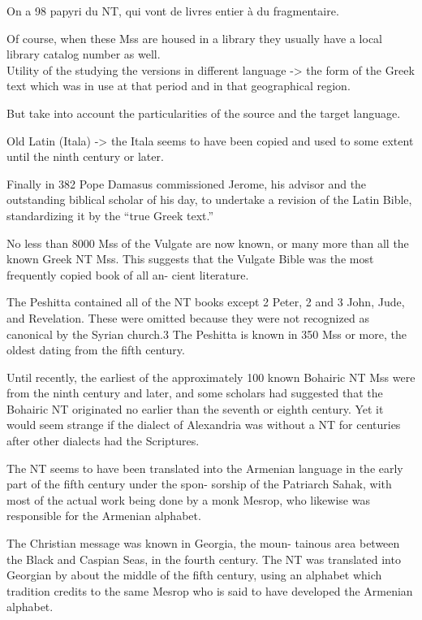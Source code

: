 On a 98 papyri du NT, qui vont de livres entier à du fragmentaire.

Of course, when these Mss are housed in a library
they usually have a local library catalog number as well.\\


Utility of the studying the versions in different language -> the form of the Greek text which was in use at that period and
in that geographical region.

But take into account the particularities of the source and the target language.

Old Latin (Itala)
-> the Itala seems to have
been copied and used to some extent until the ninth century
or later.

Finally in
382 Pope Damasus commissioned Jerome, his advisor and the
outstanding biblical scholar of his day, to undertake a revision
of the Latin Bible, standardizing it by the “true Greek text.” 

No less than 8000 Mss of the Vulgate are now known, or many
more than all the known Greek NT Mss. This suggests that the
Vulgate Bible was the most frequently copied book of all an-
cient literature. 


The Peshitta contained all of the NT books except 2 Peter,
2 and 3 John, Jude, and Revelation. These were omitted because
they were not recognized as canonical by the Syrian church.3
The Peshitta is known in 350 Mss or more, the oldest dating
from the fifth century.


Until recently, the earliest of
the approximately 100 known Bohairic NT Mss were from the
ninth century and later, and some scholars had suggested that
the Bohairic NT originated no earlier than the seventh or eighth
century. Yet it would seem strange if the dialect of Alexandria
was without a NT for centuries after other dialects had the
Scriptures. 


The NT seems to have been translated into the Armenian
language in the early part of the fifth century under the spon-
sorship of the Patriarch Sahak, with most of the actual work
being done by a monk Mesrop, who likewise was responsible
for the Armenian alphabet.

The Christian message was known in Georgia, the moun-
tainous area between the Black and Caspian Seas, in the fourth
century. The NT was translated into Georgian by about the middle
of the fifth century, using an alphabet which tradition credits to
the same Mesrop who is said to have developed the Armenian
alphabet. 



